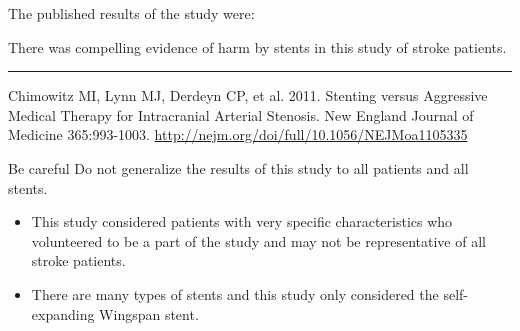\documentclass{beamer}
\begin{document}
\begin{frame}
\begin{note}
The published results of the study were:
\vspace{-1.5mm}\begin{center}There was compelling evidence of harm by stents in this study of stroke patients.\end{center}\vspace{-4mm}
\rule{0.5\linewidth}{0.4pt}

{ Chimowitz MI, Lynn MJ, Derdeyn CP, et al. 2011. Stenting versus Aggressive Medical Therapy for Intracranial Arterial Stenosis. New England Journal of Medicine 365:993-1003. \url{http://nejm.org/doi/full/10.1056/NEJMoa1105335}}
\end{note}\pause

\begin{block}{Be careful}
Do not generalize the results of this study to all patients and all stents.\pause

\begin{itemize}
\item This study considered patients with very specific characteristics who volunteered to be a part of the study and may not be representative of all stroke patients.\pause
\item There are many types of stents and this study only considered the self-expanding Wingspan stent.
\end{itemize}
\end{block}
\end{frame}
\end{document}
